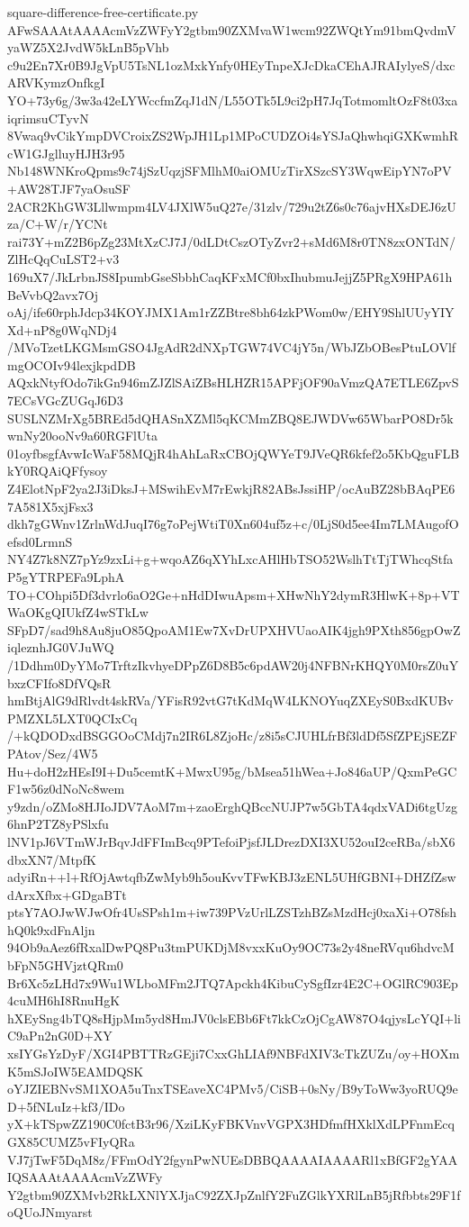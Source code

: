 \documentclass[11pt]{article}
\theoremstyle{definition}
\theoremstyle{remark}
\begin{document}
\begin{filecontents*}[overwrite]{square-difference-free-certificate.py}
AFwSAAAtAAAAcmVzZWFyY2gtbm90ZXMvaW1wcm92ZWQtYm91bmQvdmVyaWZ5X2JvdW5kLnB5pVhb
c9u2En7Xr0B9JgVpU5TsNL1ozMxkYnfy0HEyTnpeXJcDkaCEhAJRAIylyeS/dxcARVKymzOnfkgI
YO+73y6g/3w3a42eLYWccfmZqJ1dN/L55OTk5L9ci2pH7JqTotmomltOzF8t03xaiqrimsuCTyvN
8Vwaq9vCikYmpDVCroixZS2WpJH1Lp1MPoCUDZOi4sYSJaQhwhqiGXKwmhRcW1GJglluyHJH3r95
Nb148WNKroQpms9c74jSzUqzjSFMlhM0aiOMUzTirXSzcSY3WqwEipYN7oPV+AW28TJF7yaOsuSF
2ACR2KhGW3Lllwmpm4LV4JXlW5uQ27e/31zlv/729u2tZ6s0c76ajvHXsDEJ6zUza/C+W/r/YCNt
rai73Y+mZ2B6pZg23MtXzCJ7J/0dLDtCszOTyZvr2+sMd6M8r0TN8zxONTdN/ZlHcQqCuLST2+v3
169uX7/JkLrbnJS8IpumbGseSbbhCaqKFxMCf0bxIhubmuJejjZ5PRgX9HPA61hBeVvbQ2avx7Oj
oAj/ife60rphJdcp34KOYJMX1Am1rZZBtre8bh64zkPWom0w/EHY9ShlUUyYIYXd+nP8g0WqNDj4
/MVoTzetLKGMsmGSO4JgAdR2dNXpTGW74VC4jY5n/WbJZbOBesPtuLOVlfmgOCOIv94lexjkpdDB
AQxkNtyfOdo7ikGn946mZJZlSAiZBsHLHZR15APFjOF90aVmzQA7ETLE6ZpvS7ECsVGcZUGqJ6D3
SUSLNZMrXg5BREd5dQHASnXZMl5qKCMmZBQ8EJWDVw65WbarPO8Dr5kwnNy20ooNv9a60RGFlUta
01oyfbsgfAvwIcWaF58MQjR4hAhLaRxCBOjQWYeT9JVeQR6kfef2o5KbQguFLBkY0RQAiQFfysoy
Z4ElotNpF2ya2J3iDksJ+MSwihEvM7rEwkjR82ABsJssiHP/ocAuBZ28bBAqPE67A581X5xjFsx3
dkh7gGWnv1ZrlnWdJuqI76g7oPejWtiT0Xn604uf5z+c/0LjS0d5ee4Im7LMAugofOefsd0LrmnS
NY4Z7k8NZ7pYz9zxLi+g+wqoAZ6qXYhLxcAHlHbTSO52WslhTtTjTWhcqStfaP5gYTRPEFa9LphA
TO+COhpi5Df3dvrlo6aO2Ge+nHdDIwuApsm+XHwNhY2dymR3HlwK+8p+VTWaOKgQIUkfZ4wSTkLw
SFpD7/sad9h8Au8juO85QpoAM1Ew7XvDrUPXHVUaoAIK4jgh9PXth856gpOwZiqleznhJG0VJuWQ
/1Ddhm0DyYMo7TrftzIkvhyeDPpZ6D8B5c6pdAW20j4NFBNrKHQY0M0rsZ0uYbxzCFIfo8DfVQsR
hmBtjAlG9dRlvdt4skRVa/YFisR92vtG7tKdMqW4LKNOYuqZXEyS0BxdKUBvPMZXL5LXT0QCIxCq
/+kQDODxdBSGGOoCMdj7n2IR6L8ZjoHc/z8i5sCJUHLfrBf3ldDf5SfZPEjSEZFPAtov/Sez/4W5
Hu+doH2zHEsI9I+Du5cemtK+MwxU95g/bMsea51hWea+Jo846aUP/QxmPeGCF1w56z0dNoNc8wem
y9zdn/oZMo8HJIoJDV7AoM7m+zaoErghQBccNUJP7w5GbTA4qdxVADi6tgUzg6hnP2TZ8yPSlxfu
lNV1pJ6VTmWJrBqvJdFFImBcq9PTefoiPjsfJLDrezDXI3XU52ouI2ceRBa/sbX6dbxXN7/MtpfK
adyiRn++l+RfOjAwtqfbZwMyb9h5ouKvvTFwKBJ3zENL5UHfGBNI+DHZfZswdArxXfbx+GDgaBTt
ptsY7AOJwWJwOfr4UsSPsh1m+iw739PVzUrlLZSTzhBZsMzdHcj0xaXi+O78fshhQ0k9xdFnAljn
94Ob9aAez6fRxalDwPQ8Pu3tmPUKDjM8vxxKuOy9OC73s2y48neRVqu6hdvcMbFpN5GHVjztQRm0
Br6Xc5zLHd7x9Wu1WLboMFm2JTQ7Apckh4KibuCySgfIzr4E2C+OGlRC903Ep4cuMH6hI8RnuHgK
hXEySng4bTQ8sHjpMm5yd8HmJV0clsEBb6Ft7kkCzOjCgAW87O4qjysLcYQI+liC9aPn2nG0D+XY
xsIYGsYzDyF/XGI4PBTTRzGEji7CxxGhLIAf9NBFdXIV3cTkZUZu/oy+HOXmK5mSJoIW5EAMDQSK
oYJZIEBNvSM1XOA5uTnxTSEaveXC4PMv5/CiSB+0sNy/B9yToWw3yoRUQ9eD+5fNLuIz+kf3/IDo
yX+kTSpwZZ190C0fctB3r96/XziLKyFBKVnvVGPX3HDfmfHXklXdLPFnmEcqGX85CUMZ5vFIyQRa
VJ7jTwF5DqM8z/FFmOdY2fgynPwNUEsDBBQAAAAIAAAARl1xBfGF2gYAAIQSAAAtAAAAcmVzZWFy
Y2gtbm90ZXMvb2RkLXNlYXJjaC92ZXJpZnlfY2FuZGlkYXRlLnB5jRfbbts29F1foQUoJNmyarst

\end{filecontents*}
\end{document}
